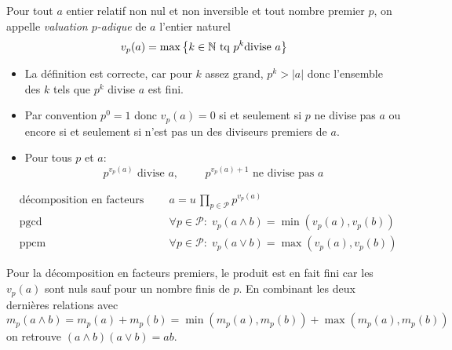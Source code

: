 \begin{propn}
\begin{demo}
\end{demo}
\begin{defi}
Pour tout $a$ entier relatif non nul et non inversible et tout nombre premier $p$, on appelle \emph{valuation $p$-adique} de $a$ l'entier naturel
\begin{displaymath}
  v_p(a) = \max\left\lbrace k\in \mathbb{N} \text{ tq } p^k \text{divise } a\right\rbrace 
\end{displaymath}
\end{defi}
\begin{rems}
\begin{itemize}
  \item La définition est correcte, car pour $k$ assez grand, $p^k >|a|$ donc l'ensemble des $k$ tels que $p^k$ divise $a$ est fini.
  \item Par convention $p^0=1$ donc $v_p(a)=0$ si et seulement si $p$ ne divise pas $a$ ou encore si et seulement si n'est pas un des diviseurs premiers de $a$.
  \item Pour tous $p$ et $a$:
\begin{displaymath}
  p^{v_p(a)}\text{ divise } a,\hspace{1cm} p^{v_p(a)+1}\text{ ne divise pas } a
\end{displaymath}
\end{itemize}
\end{rems}
\begin{prop}
\begin{align*}
  &\text{décomposition en facteurs premiers:}& a= u\,\prod_{p\in \mathcal P}p^{v_p(a)}\\
  &\text{pgcd}&\forall p\in \mathcal P :\; v_p(a\wedge b) = \min(v_p(a),v_p(b))\\
  &\text{ppcm}&\forall p\in \mathcal P :\; v_p(a\vee b)=\max(v_p(a),v_p(b))
\end{align*}
\end{prop}
\begin{rem}
Pour la décomposition en facteurs premiers, le produit est en fait fini car les $v_p(a)$ sont nuls sauf pour un nombre finis de $p$.\newline
En combinant les deux dernières relations avec 
\begin{displaymath}
m_p(a\wedge b)=m_p(a)+m_p(b)= \min(m_p(a),m_p(b))+ \max(m_p(a),m_p(b))
\end{displaymath}
on retrouve $(a\wedge b)(a\vee b)=ab$.
\end{rem}


\end{propn}
